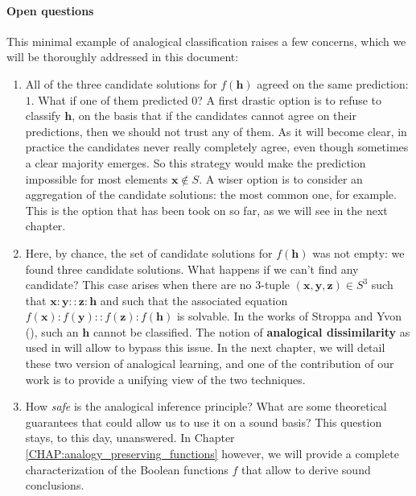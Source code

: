 \paragraph{Open questions\\}

This minimal example of analogical classification raises a few concerns, which
we will be thoroughly addressed in this document:
\begin{enumerate}
  \item All of the three candidate solutions for $f(\mathbf{h})$ agreed on the
    same prediction: $1$. What if one of them predicted $0$? A first drastic
    option is to refuse to classify $\mathbf{h}$, on the basis that if the
    candidates cannot agree on their predictions, then we should not trust any
    of them. As it will become clear, in practice the candidates never really
    completely agree, even though sometimes a clear majority emerges. So this
    strategy would make the prediction impossible for most elements $\mathbf{x}
    \notin S$. A wiser option is to consider an aggregation of the candidate
    solutions: the most common one, for example. This is the option that has
    been took on so far, as we will see in the next chapter.
  \item Here, by chance, the set of candidate solutions for $f(\mathbf{h})$ was
    not empty: we found three candidate solutions. What happens if we can't
    find any candidate? This case arises when there are no 3-tuple
    $(\mathbf{x}, \mathbf{y}, \mathbf{z}) \in S^3$ such that $\mathbf{x} :
    \mathbf{y}::\mathbf{z}:\mathbf{h}$ and such that the associated equation
    $f(\mathbf{x}):f(\mathbf{y})::f(\mathbf{z}):f(\mathbf{h})$ is solvable. In
    the works of Stroppa and Yvon (\cite{StrYvoCNLL05}), such an $\mathbf{h}$
    cannot be classified. The notion of \textbf{analogical dissimilarity} as
    used in \cite{BayMicDelIJCAI07} will allow to bypass this issue. In the
    next chapter, we will detail these two version of analogical learning, and
    one of the contribution of our work is to provide a unifying view of the
    two techniques.
  \item How \textit{safe} is the analogical inference principle? What are some
    theoretical guarantees that could allow us to use it on a sound basis? This
    question stays, to this day, unanswered. In Chapter
    \ref{CHAP:analogy_preserving_functions} however, we will provide a complete
    characterization of the Boolean functions $f$ that
    allow to derive sound conclusions.
\end{enumerate}

